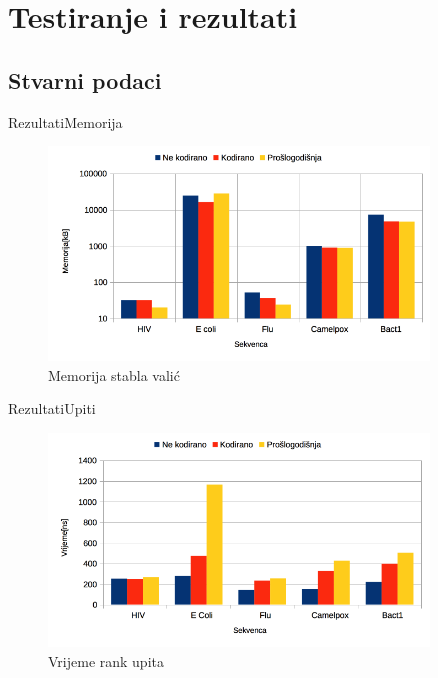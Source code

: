 \documentclass{beamer}
\begin{document}
\section{Testiranje i rezultati}
\subsection{Stvarni podaci}
\begin{frame}{Rezultati}{Memorija}
\begin{figure}[H]
\centering
\includegraphics[width=0.9\textwidth]{chart/memorija_stabla.png}
\caption{Memorija stabla valić}
\end{figure}
\end{frame}


\begin{frame}{Rezultati}{Upiti}
\begin{figure}[H]
\centering
\includegraphics[width=0.9\textwidth]{chart/rank_vrijeme.png}
\caption{Vrijeme rank upita}
\end{figure}
\end{frame}
\end{document}
